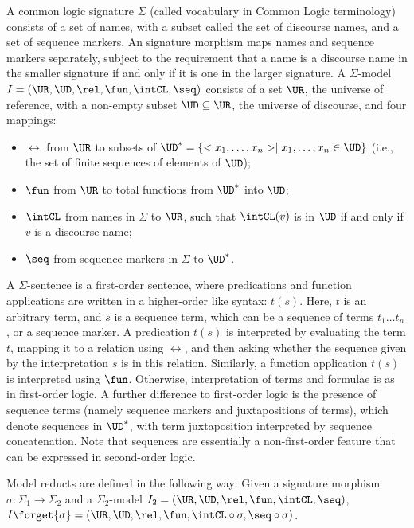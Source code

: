 \documentclass[10pt,fleqn,final]{scrreprt}
\providecommand{\DIFadd}[1]{{\protect\color{blue}\uwave{#1}}} %
\providecommand{\DIFdel}[1]{{\protect\color{red}\sout{#1}}}                      %
\providecommand{\DIFaddbegin}{} %
\providecommand{\DIFaddend}{} %
\providecommand{\DIFdelbegin}{} %
\providecommand{\DIFdelend}{} %
\begin{document}
\begin{definition}\label{CommonLogic}   
A common logic signature
$\Sigma$ (called vocabulary in Common Logic terminology) consists of a
set of names, with a subset called the set of discourse names, and a
set of sequence markers. An signature morphism maps
names and sequence markers separately, subject to the requirement
 that a name is a discourse
name in the smaller signature if and only if it is one in the larger signature.  A $\Sigma$-model $I=(\UR,\UD,\rel,\fun,\intCL,\seq)$ consists of a set $\UR$,
the universe of reference, with a non-empty subset $\UD\subseteq \UR$,
the universe of discourse, and four mappings:
  \begin{itemize}
   \item $\rel$ from $\UR$ to subsets of \DIFdelbegin \DIFdel{$\UD^* = \{<x_1,\ldots,x_n> \mid
x_1,\ldots,x_n \in \UD\}$ }\DIFdelend \DIFaddbegin \DIFadd{$\UD^* = \{ \langle x_1,\ldots,x_n\rangle \mid
x_1,\ldots,x_n \in \UD\}$ }\DIFaddend (i.e., the set of finite sequences of
elements of $\UD$);
   \item $\fun$ from $\UR$ to total functions from $\UD^*$ into $\UD$;
   \item $\intCL$ from names in $\Sigma$ to $\UR$, such that
$\intCL(v)$ is in $\UD$ if and only if $v$ is a discourse name;
   \item $\seq$ from sequence markers in $\Sigma$ to $\UD^*$.
  \end{itemize}  A $\Sigma$-sentence is a first-order
sentence, where predications and function applications are written
in a higher-order like syntax: $t(s)$.
Here, $t$ is an arbitrary term, and $s$ is a sequence term, which can
be a sequence of terms $t_1\ldots t_n$, or a sequence marker.
A predication $t(s)$ is interpreted by evaluating the term $t$,
mapping it to a relation using $\rel$, and then asking whether the sequence
given by the interpretation $s$ is in this relation.  
Similarly, a function application $t(s)$ is interpreted using $\fun$.
Otherwise, interpretation of terms and formulae is as in
first-order logic. 
A further
difference to first-order logic
is the presence of sequence terms (namely sequence markers and
juxtapositions of terms), which denote sequences in $\UD^*$, with term
juxtaposition interpreted by sequence concatenation.
Note that sequences are essentially a non-first-order feature that
can be expressed in second-order logic.

Model reducts are defined in the following way: 
Given a signature morphism $\sigma:\Sigma_1\to\Sigma_2$ and a $\Sigma_2$-model
$I_2=(\UR,\UD,\rel,\fun,\intCL,\seq)$, $I\forget{\sigma}=(\UR,\UD,\rel,\fun,\intCL\circ\sigma,\seq\circ\sigma)$. 


\end{definition}
\end{document}
